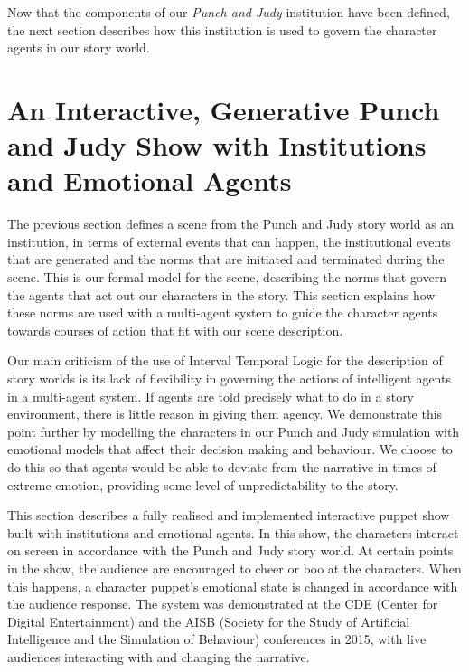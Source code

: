 \documentclass[11pt]{report}
\begin{document}
Now that the components of our \emph{Punch and Judy} institution have been
defined, the next section describes how this institution is used to govern the
character agents in our story world.

\section{An Interactive, Generative Punch and Judy Show with Institutions and
  Emotional Agents}
\label{sec:punchjudy}
The previous section defines a scene from the Punch and Judy story world as an
institution, in terms of external events that can happen, the institutional
events that are generated and the norms that are initiated and terminated during
the scene. This is our formal model for the scene, describing the norms that
govern the agents that act out our characters in the story. This section explains
how these norms are used with a multi-agent system to guide the character agents
towards courses of action that fit with our scene description.

Our main criticism of the use of Interval Temporal Logic for the description of
story worlds is its lack of flexibility in governing the actions of intelligent
agents in a multi-agent system. If agents are told precisely what to do in a
story environment, there is little reason in giving them agency. We demonstrate
this point further by modelling the characters in our Punch and Judy simulation
with emotional models that affect their decision making and behaviour. We choose
to do this so that agents would be able to deviate from the narrative in times
of extreme emotion, providing some level of unpredictability to the story.

This section describes a fully realised and implemented interactive puppet show
built with institutions and emotional agents. In this show, the characters
interact on screen in accordance with the Punch and Judy story world. At certain
points in the show, the audience are encouraged to cheer or boo at the
characters. When this happens, a character puppet's emotional state is changed
in accordance with the audience response. The system was demonstrated at the CDE
(Center for Digital Entertainment) and the AISB (Society for the Study of
Artificial Intelligence and the Simulation of Behaviour) conferences in 2015,
with live audiences interacting with and changing the narrative.
\end{document}
